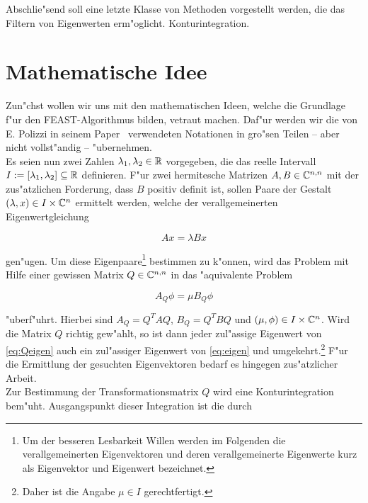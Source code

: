 Abschlie"send soll eine letzte Klasse von Methoden vorgestellt werden, die
das Filtern von Eigenwerten erm"oglicht. Konturintegration.

\section{Mathematische Idee} \label{sec:math}%
Zun"chst wollen wir uns mit den mathematischen Ideen, welche die
Grundlage f"ur den \textsc{FEAST}-Algorithmus bilden, vetraut machen. Daf"ur werden wir
die von E. Polizzi in seinem Paper~\cite{polizzi} verwendeten Notationen in gro"sen
Teilen -- aber nicht vollst"andig -- "ubernehmen.\\

Es seien nun zwei  Zahlen $\lambda_1, \lambda_2 \in \mathbb{R}$ vorgegeben, die
das reelle Intervall $I:=[\lambda_1, \lambda_2] \subseteq \mathbb{R}$ definieren.
F"ur zwei hermitesche Matrizen $A, B \in \mathbb{C}^{n,n}$ mit der zus"atzlichen
Forderung, dass $B$ positiv definit ist, sollen Paare der Gestalt
$(\lambda, x) \in I \times \mathbb{C}^n$ ermittelt werden, welche der verallgemeinerten
Eigenwertgleichung

  \begin{equation}\label{eq:eigen} %
  Ax = \lambda Bx
  \end{equation}

gen"ugen. Um diese Eigenpaare\footnote{Um der besseren Lesbarkeit Willen werden
im Folgenden die verallgemeinerten Eigenvektoren und deren verallgemeinerte
Eigenwerte kurz als Eigenvektor und Eigenwert bezeichnet.}
bestimmen zu k"onnen, wird das Problem mit Hilfe einer
gewissen Matrix $Q\in\mathbb{C}^{n,n}$ in das "aquivalente Problem

  \begin{equation}\label{eq:Qeigen}
  A_Q \phi = \mu B_Q \phi
  \end{equation}

"uberf"uhrt. Hierbei sind $A_Q = Q^TAQ$, $B_Q = Q^TBQ$ und $(\mu, \phi)
\in I\times\mathbb{C}^n$.
Wird die Matrix $Q$ richtig gew"ahlt, so ist dann jeder zul"assige Eigenwert von
\eqref{eq:Qeigen} auch ein zul"assiger Eigenwert von \eqref{eq:eigen} und
umgekehrt.\footnote{Daher ist die Angabe $\mu\in I$ gerechtfertigt.}
F"ur die Ermittlung der gesuchten Eigenvektoren bedarf es hingegen zus"atzlicher Arbeit.\\

Zur Bestimmung der Transformationsmatrix $Q$ wird eine Konturintegration bem"uht.
Ausgangspunkt dieser Integration ist die durch

